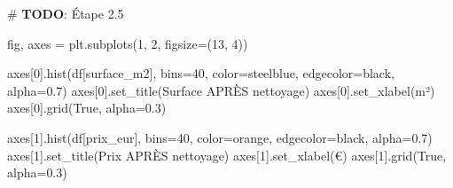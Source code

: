 \documentclass[
  french,
  11pt,
  a4paper,
]{scrbook}
\newenvironment{Shaded}{}{}
\newcommand{\AlertTok}[1]{\textcolor[rgb]{1.00,0.33,0.33}{\textbf{#1}}}
\newcommand{\CommentTok}[1]{\textcolor[rgb]{0.42,0.45,0.49}{#1}}
\newcommand{\DecValTok}[1]{\textcolor[rgb]{0.00,0.36,0.77}{#1}}
\newcommand{\FloatTok}[1]{\textcolor[rgb]{0.00,0.36,0.77}{#1}}
\newcommand{\NormalTok}[1]{\textcolor[rgb]{0.14,0.16,0.18}{#1}}
\newcommand{\OperatorTok}[1]{\textcolor[rgb]{0.14,0.16,0.18}{#1}}
\newcommand{\StringTok}[1]{\textcolor[rgb]{0.01,0.18,0.38}{#1}}
\newcommand{\VariableTok}[1]{\textcolor[rgb]{0.89,0.38,0.04}{#1}}
\begin{document}
\begin{Shaded}
\begin{Highlighting}[]
\CommentTok{\# }\AlertTok{TODO}\CommentTok{: Étape 2.5}
\end{Highlighting}
\end{Shaded}

\begin{tcolorbox}[enhanced jigsaw, arc=.35mm, bottomrule=.15mm, bottomtitle=1mm, breakable, colback=white, colbacktitle=quarto-callout-tip-color!10!white, colframe=quarto-callout-tip-color-frame, coltitle=black, left=2mm, leftrule=.75mm, opacityback=0, opacitybacktitle=0.6, rightrule=.15mm, title=\textcolor{quarto-callout-tip-color}{\faLightbulb}\hspace{0.5em}{✅ Corrigé Étape 2.5}, titlerule=0mm, toprule=.15mm, toptitle=1mm]

\begin{Shaded}
\begin{Highlighting}[]
\NormalTok{fig, axes }\OperatorTok{=}\NormalTok{ plt.subplots(}\DecValTok{1}\NormalTok{, }\DecValTok{2}\NormalTok{, figsize}\OperatorTok{=}\NormalTok{(}\DecValTok{13}\NormalTok{, }\DecValTok{4}\NormalTok{))}

\NormalTok{axes[}\DecValTok{0}\NormalTok{].hist(df[}\StringTok{\textquotesingle{}surface\_m2\textquotesingle{}}\NormalTok{], bins}\OperatorTok{=}\DecValTok{40}\NormalTok{, color}\OperatorTok{=}\StringTok{\textquotesingle{}steelblue\textquotesingle{}}\NormalTok{, edgecolor}\OperatorTok{=}\StringTok{\textquotesingle{}black\textquotesingle{}}\NormalTok{, alpha}\OperatorTok{=}\FloatTok{0.7}\NormalTok{)}
\NormalTok{axes[}\DecValTok{0}\NormalTok{].set\_title(}\StringTok{\textquotesingle{}Surface APRÈS nettoyage\textquotesingle{}}\NormalTok{)}
\NormalTok{axes[}\DecValTok{0}\NormalTok{].set\_xlabel(}\StringTok{\textquotesingle{}m²\textquotesingle{}}\NormalTok{)}
\NormalTok{axes[}\DecValTok{0}\NormalTok{].grid(}\VariableTok{True}\NormalTok{, alpha}\OperatorTok{=}\FloatTok{0.3}\NormalTok{)}

\NormalTok{axes[}\DecValTok{1}\NormalTok{].hist(df[}\StringTok{\textquotesingle{}prix\_eur\textquotesingle{}}\NormalTok{], bins}\OperatorTok{=}\DecValTok{40}\NormalTok{, color}\OperatorTok{=}\StringTok{\textquotesingle{}orange\textquotesingle{}}\NormalTok{, edgecolor}\OperatorTok{=}\StringTok{\textquotesingle{}black\textquotesingle{}}\NormalTok{, alpha}\OperatorTok{=}\FloatTok{0.7}\NormalTok{)}
\NormalTok{axes[}\DecValTok{1}\NormalTok{].set\_title(}\StringTok{\textquotesingle{}Prix APRÈS nettoyage\textquotesingle{}}\NormalTok{)}
\NormalTok{axes[}\DecValTok{1}\NormalTok{].set\_xlabel(}\StringTok{\textquotesingle{}€\textquotesingle{}}\NormalTok{)}
\NormalTok{axes[}\DecValTok{1}\NormalTok{].grid(}\VariableTok{True}\NormalTok{, alpha}\OperatorTok{=}\FloatTok{0.3}\NormalTok{)}


\end{Highlighting}
\end{Shaded}
\end{tcolorbox}
\end{document}
